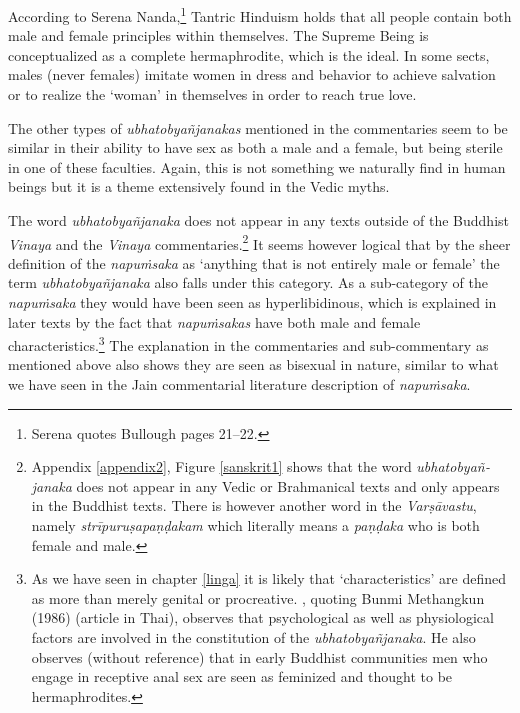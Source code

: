 According to Serena Nanda,\footnote{Serena \cite{nanda} quotes Bullough pages 21–22.} Tantric Hinduism holds that all people contain both male and female principles within themselves. The Supreme Being is conceptualized as a complete hermaphrodite, which is the ideal. In some sects, males (never females) imitate women in dress and behavior to achieve salvation or to realize the `woman' in themselves in order to reach true love.

The other types of {\em ubhatob­yañ­janakas} mentioned in the commentaries seem to be similar in their ability to have sex as both a male and a female, but being sterile in one of these faculties. Again, this is not something we naturally find in human beings but it is a theme extensively found in the Vedic myths.


The word {\em ubhatob­yañ­janaka} does not appear in any texts outside of the Buddhist {\em Vinaya} and the {\em Vinaya} commentaries.\footnote{Appendix \ref{appendix2}, Figure \ref{sanskrit1} shows that the word {\em ubhatob­yañ­janaka} does not appear in any Vedic or Brahmanical texts and only appears in the Buddhist texts. There is however another word in the {\em Varṣāvastu}, namely {\em strīpuruṣapaṇḍakam} which literally means a {\em paṇḍaka} who is both female and male.} It seems however logical that by the sheer definition of the {\em napuṁsaka} as `anything that is not entirely male or female' the term {\em ubhatob­yañ­janaka} also falls under this category. As a sub-category of the {\em napuṁsaka} they would have been seen as hyperlibidinous, which is explained in later texts by the fact that {\em napuṁsakas} have both male and female characteristics.\footnote{As we have seen in chapter \ref{linga} it is likely that `characteristics' are defined as more than merely genital or procreative. \cite{jackson}, quoting Bunmi Methangkun (1986) (article in Thai), observes that psychological as well as physiological factors are involved in the constitution of the {\em ubhatob­yañ­janaka}. He also observes (without reference) that in early Buddhist communities men who engage in receptive anal sex are seen as feminized and thought to be hermaphrodites.} The explanation in the commentaries and sub-commentary as mentioned above also shows they are seen as bisexual in nature, similar to what we have seen in the Jain commentarial literature description of {\em napuṁsaka}.

